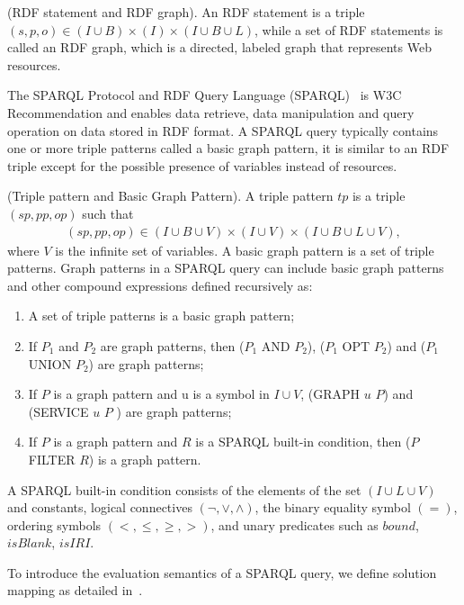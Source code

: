 \begin{Definition}
(RDF statement and RDF graph). An RDF statement is a triple $(s, p, o) \in (I \cup B) \times (I) \times (I \cup B \cup L)$, while a set of RDF statements is called an RDF graph, which is a directed, labeled graph that represents Web resources.
\end{Definition}

The SPARQL Protocol and RDF Query Language (SPARQL)~\cite{harris2013sparql} is W3C Recommendation and enables data retrieve, data manipulation and query operation on data stored in RDF format.
A SPARQL query typically contains one or more triple patterns called a basic graph pattern, it is similar to an RDF triple except for the possible presence of variables instead of resources.

\begin{Definition}
(Triple pattern and Basic Graph Pattern). A triple pattern $tp$ is a triple $(sp, pp, op)$ such that
\noindent\begin{align*}
(sp, pp, op) \in (I \cup B \cup V ) \times (I \cup V ) \times (I \cup B \cup L\cup V ),
\end{align*}  
where $V$ is the infinite set of variables. 
A basic graph pattern is a set of triple patterns.
Graph patterns in a SPARQL query can include basic graph patterns and other compound expressions defined recursively as:
\begin{enumerate}[nosep]
\item A set of triple patterns is a basic graph pattern;
\item If $P_1$ and $P_2$ are graph patterns, then ($P_1$ AND $P_2$), ($P_1$ OPT $P_2$) and ($P_1$ UNION $P_2$) are graph patterns;
\item If $P$ is a graph pattern and u is a symbol in $I \cup V$, (GRAPH $u$ $P$) and (SERVICE $u$ $P$ ) are graph patterns;
\item If $P$ is a graph pattern and $R$ is a SPARQL built-in condition, then ($P$ FILTER $R$) is a graph pattern.
\end{enumerate}
\end{Definition}

A SPARQL built-in condition consists of the elements of the set
$(I\cup L \cup V)$ and constants, logical connectives $(\neg, \vee, \wedge)$, the binary equality symbol $(=)$, ordering symbols
$(<,\leq,\geq,>)$, and unary predicates such as $bound$,
$isBlank$, $isIRI$.

To introduce the evaluation semantics of a SPARQL query, we define solution mapping as detailed in~\cite{DBLP:journals/tods/PerezAG09,harris2013sparql}.

